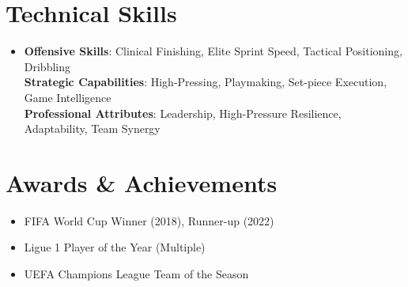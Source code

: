 \documentclass[letterpaper,11pt]{article}
\newcommand{\resumeItem}[1]{\item\small{{#1 \vspace{-2pt}}}}
\newcommand{\resumeSubHeadingListStart}{\begin{itemize}[leftmargin=0.15in, label={}]}
\newcommand{\resumeSubHeadingListEnd}{\end{itemize}}
\begin{document}
\section{Technical Skills}
\begin{itemize}[leftmargin=0.15in, label={}]
\item{
\textbf{Offensive Skills}{: Clinical Finishing, Elite Sprint Speed, Tactical Positioning, Dribbling} \\
\textbf{Strategic Capabilities}{: High-Pressing, Playmaking, Set-piece Execution, Game Intelligence} \\
\textbf{Professional Attributes}{: Leadership, High-Pressure Resilience, Adaptability, Team Synergy}
}
\end{itemize}

\section{Awards \& Achievements}
\resumeSubHeadingListStart
\resumeItem{FIFA World Cup Winner (2018), Runner-up (2022)}
\resumeItem{Ligue 1 Player of the Year (Multiple)}
\resumeItem{UEFA Champions League Team of the Season}
\resumeSubHeadingListEnd
\end{document}
